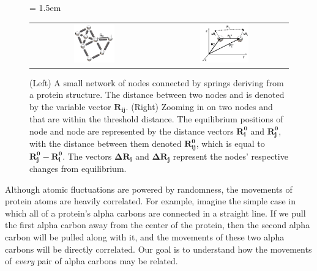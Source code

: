 \begin{figure}[h]
	\centering
	\tabcolsep = 1.5em
	\mySfFamily
	\begin{tabular}{c c}
		\includegraphics[width = 0.33\textwidth]{../images/gaussian_network_small.png} & \includegraphics[width = 0.4\textwidth]{../images/gaussian_network_vectors.png}
	\end{tabular}
	\caption{(Left) A small network of nodes connected by springs deriving from a protein structure. The distance between two nodes  and  is denoted by the variable vector $\textbf{R}_\textbf{ij}$. (Right) Zooming in on two nodes  and  that are within the threshold distance. The equilibrium positions of node  and node  are represented by the distance vectors $ \textbf{R}_\textbf{i}^\textbf{0} $ and $\textbf{R}_\textbf{j}^\textbf{0}$, with the distance between them denoted $\textbf{R}_{\textbf{ij}}^\textbf{0}$, which is equal to $\textbf{R}_\textbf{j}^\textbf{0} - \textbf{R}_\textbf{i}^\textbf{0}$. The vectors $\mathbf{\Delta} \textbf{R}_\textbf{i} $ and $ \mathbf{\Delta} \textbf{R}_\textbf{j}$ represent the nodes' respective changes from equilibrium.}
	\label{fig:gaussian_fluctuations}
\end{figure}

Although atomic fluctuations are powered by randomness, the movements of protein atoms are heavily correlated. For example, imagine the simple case in which all of a protein's alpha carbons are connected in a straight line. If we pull the first alpha carbon away from the center of the protein, then the second alpha carbon will be pulled along with it, and the movements of these two alpha carbons will be directly correlated. Our goal is to understand how the movements of \textit{every} pair of alpha carbons may be related.

